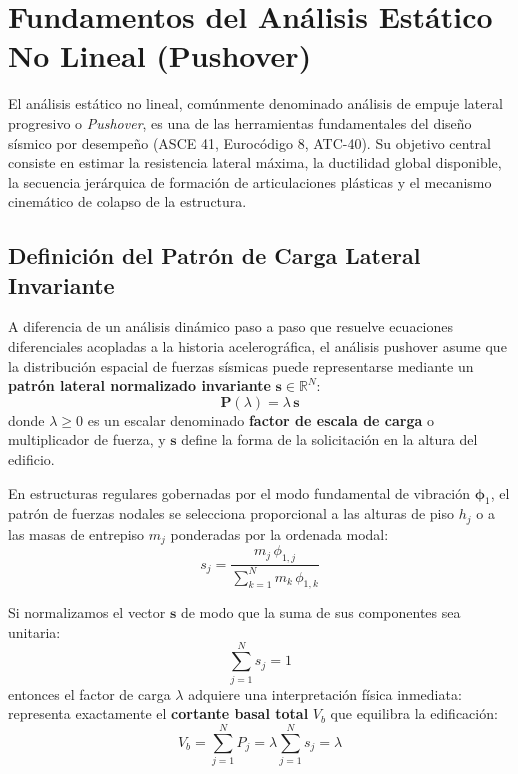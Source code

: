 \documentclass[11pt,letterpaper]{article}
\begin{document}
\section{Fundamentos del Análisis Estático No Lineal (Pushover)}

El análisis estático no lineal, comúnmente denominado análisis de empuje lateral progresivo o \textit{Pushover}, es una de las herramientas fundamentales del diseño sísmico por desempeño (ASCE 41, Eurocódigo 8, ATC-40). Su objetivo central consiste en estimar la resistencia lateral máxima, la ductilidad global disponible, la secuencia jerárquica de formación de articulaciones plásticas y el mecanismo cinemático de colapso de la estructura.

\subsection{Definición del Patrón de Carga Lateral Invariante}

A diferencia de un análisis dinámico paso a paso que resuelve ecuaciones diferenciales acopladas a la historia acelerográfica, el análisis pushover asume que la distribución espacial de fuerzas sísmicas puede representarse mediante un \textbf{patrón lateral normalizado invariante} $\mathbf{s} \in \mathbb{R}^N$:
\begin{equation}
    \label{eq:fuerzas_externas}
    \mathbf{P}(\lambda) = \lambda \, \mathbf{s}
\end{equation}
donde $\lambda \ge 0$ es un escalar denominado \textbf{factor de escala de carga} o multiplicador de fuerza, y $\mathbf{s}$ define la forma de la solicitación en la altura del edificio.

En estructuras regulares gobernadas por el modo fundamental de vibración $\boldsymbol{\phi}_1$, el patrón de fuerzas nodales se selecciona proporcional a las alturas de piso $h_j$ o a las masas de entrepiso $m_j$ ponderadas por la ordenada modal:
\begin{equation}
    s_j = \frac{m_j \, \phi_{1,j}}{\sum_{k=1}^N m_k \, \phi_{1,k}}
\end{equation}

Si normalizamos el vector $\mathbf{s}$ de modo que la suma de sus componentes sea unitaria:
\begin{equation}
    \sum_{j=1}^N s_j = 1
\end{equation}
entonces el factor de carga $\lambda$ adquiere una interpretación física inmediata: representa exactamente el \textbf{cortante basal total} $V_b$ que equilibra la edificación:
\begin{equation}
    V_b = \sum_{j=1}^N P_j = \lambda \sum_{j=1}^N s_j = \lambda
\end{equation}
\end{document}
